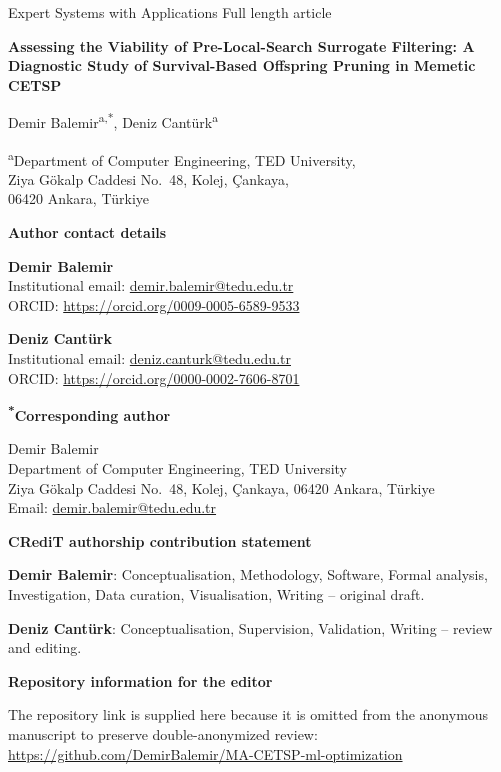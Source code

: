 \documentclass[a4paper,11pt]{article}
\begin{document}
{\small Expert Systems with Applications \hfill Full length article}

\vspace{5mm}
{\raggedright{}\fontsize{15}{18}\selectfont\bfseries
Assessing the Viability of Pre-Local-Search Surrogate Filtering:
A Diagnostic Study of Survival-Based Offspring Pruning in Memetic CETSP\par}

\vspace{4mm}
{\large Demir Balemir\textsuperscript{a,*}, Deniz Cant{\"u}rk\textsuperscript{a}\par}

\vspace{2mm}
\textsuperscript{a}Department of Computer Engineering, TED University,\\
Ziya G{\"o}kalp Caddesi No.~48, Kolej, {\c C}ankaya,\\
06420 Ankara, T{\"u}rkiye

\vspace{3mm}
\textbf{Author contact details}

\textbf{Demir Balemir}\\
Institutional email: \href{mailto:demir.balemir@tedu.edu.tr}{demir.balemir@tedu.edu.tr}\\
ORCID: \url{https://orcid.org/0009-0005-6589-9533}

\textbf{Deniz Cant{\"u}rk}\\
Institutional email: \href{mailto:deniz.canturk@tedu.edu.tr}{deniz.canturk@tedu.edu.tr}\\
ORCID: \url{https://orcid.org/0000-0002-7606-8701}

\vspace{2mm}
\textbf{\textsuperscript{*}Corresponding author}

Demir Balemir\\
Department of Computer Engineering, TED University\\
Ziya G{\"o}kalp Caddesi No.~48, Kolej, {\c C}ankaya, 06420 Ankara, T{\"u}rkiye\\
Email: \href{mailto:demir.balemir@tedu.edu.tr}{demir.balemir@tedu.edu.tr}

\vspace{2mm}
\textbf{CRediT authorship contribution statement}

\textbf{Demir Balemir}: Conceptualisation, Methodology, Software,
Formal analysis, Investigation, Data curation, Visualisation,
Writing -- original draft.

\textbf{Deniz Cant{\"u}rk}: Conceptualisation, Supervision, Validation,
Writing -- review and editing.

\vspace{2mm}
\textbf{Repository information for the editor}

The repository link is supplied here because it is omitted from the anonymous
manuscript to preserve double-anonymized review:\\
\url{https://github.com/DemirBalemir/MA-CETSP-ml-optimization}
\end{document}
